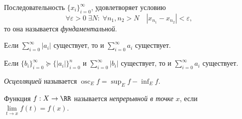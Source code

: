 \documentclass[12pt,a4paper]{article}
\DeclareMathOperator{\osc}{osc}
\begin{document}
    \begin{definition}
        Последовательность $\{x_i\}_{i=0}^\infty$, удовлетворяет условию
        \[\forall \varepsilon > 0\; \exists N:\; \forall n_1, n_2 > N \quad |x_{n_1} - x_{n_2}| < \varepsilon,\]
        то она называется \emph{фундаментальной}.
    \end{definition}

    \begin{theorem}
        Еcли $\sum_{i=0}^\infty |a_i|$ существует, то и $\sum_{i=0}^\infty a_i$ существует.
    \end{theorem}

    \begin{corollary}
        Еcли $\{b_i\}_{i=0}^\infty \succcurlyeq \{|a_i|\}_{i=0}^n$ и $\sum_{i=0}^\infty |b_i|$ существует, то и $\sum_{i=0}^\infty a_i$ существует.
    \end{corollary}

    \begin{definition}
        \emph{Осцелляцией} называется $\osc_E f = \sup_E f - \inf_E f$.
    \end{definition}

    \begin{definition}
        Функция $f: X \to \RR$ называется \emph{непрерывной в точке} $x$, если $\lim\limits_{t \to x} f(t) = f(x)$.
    \end{definition}
\end{document}

